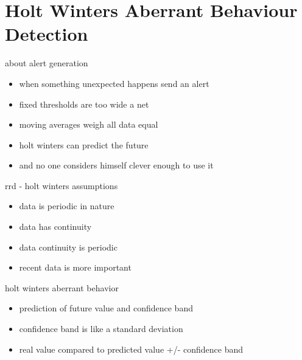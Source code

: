 \section{Holt Winters Aberrant Behaviour Detection}

\begin{frame}{about alert generation}
\begin{itemize}
\item when something unexpected happens send an alert\pause
\item fixed thresholds are too wide a net\pause
\item moving averages weigh all data equal\pause
\item holt winters can predict the future\pause
\item and no one considers himself clever enough to use it
\end{itemize}
\end{frame}

\begin{frame}{rrd - holt winters assumptions}
\begin{itemize}
\item data is periodic in nature
\item data has continuity 
\item data continuity is periodic
\item recent data is more important
\end{itemize}
\end{frame}

\begin{frame}{holt winters aberrant behavior}
\begin{itemize}
\item prediction of future value and confidence band
\item confidence band is like a standard deviation
\item real value compared to predicted value +/- confidence band
\end{itemize}
\end{frame}


